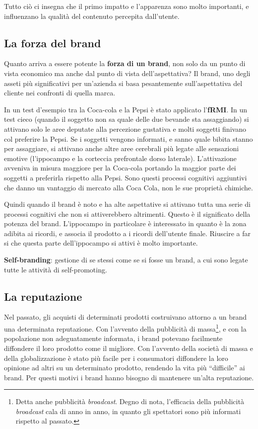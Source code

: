 Tutto ciò ci insegna che il primo impatto e l'apparenza sono molto importanti,
e influenzano la qualità del contenuto percepita dall'utente.

\subsection{La forza del brand}

Quanto arriva a essere potente la \textbf{forza di un brand}, non solo da un
punto di vista economico ma anche dal punto di vista dell'aspettativa?
Il brand, uno degli asseti più significativi per un'azienda si basa
pesantemente sull'aspettativa del cliente nei confronti di quella marca.

In un test d'esempio tra la Coca-cola e la Pepsi è stato applicato
l'\textbf{fRMI}.
In un test cieco (quando il soggetto non sa quale delle due bevande sta
assaggiando) si attivano solo le aree deputate alla percezione gustativa e
molti soggetti finivano col preferire la Pepsi. Se i soggetti vengono
informati, e sanno quale bibita stanno per assaggiare, si attivano anche altre
aree cerebrali più legate alle sensazioni emotive (l'ippocampo e la corteccia
prefrontale dorso laterale). L'attivazione avveniva in misura maggiore per la
Coca-cola portando la maggior parte dei soggetti a preferirla rispetto alla
Pepsi.
Sono questi processi cognitivi aggiuntivi che danno un vantaggio di mercato
alla Coca Cola, non le sue proprietà chimiche.

Quindi quando il brand è noto e ha alte aspettative si attivano tutta una serie
di processi cognitivi che non si attiverebbero altrimenti. Questo è il
significato della potenza del brand. L'ippocampo in particolare è interessato
in quanto è la zona adibita ai ricordi, e associa il prodotto a i ricordi
dell'utente finale. Riuscire a far si che questa parte dell'ippocampo si attivi
è molto importante.

\textbf{Self-branding}: gestione di se stessi come se si fosse un brand, a cui
sono legate tutte le attività di self-promoting.

\subsection{La reputazione}

Nel passato, gli acquisti di determinati prodotti costruivano attorno a un
brand una determinata reputazione. Con l'avvento della pubblicità di
massa\footnote{Detta anche pubblicità \textit{broadcast}. Degno di nota,
l'efficacia della pubblicità \textit{broadcast} cala di anno in anno, in
quanto gli spettatori sono più informati rispetto al passato.}, e con la
popolazione non adeguatamente informata, i brand potevano facilmente
diffondere il loro prodotto come il migliore.
Con l'avvento della società di massa e della globalizzazione è stato più
facile per i consumatori diffondere la loro opinione ad altri su un determinato
prodotto, rendendo la vita più ``difficile'' ai brand.
Per questi motivi i brand hanno bisogno di mantenere un'alta reputazione.

